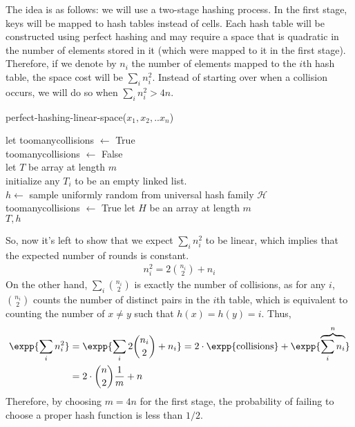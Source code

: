 The idea is as follows: we will use a two-stage hashing process. In the first stage, keys will be mapped to hash tables instead of cells. Each hash table will be constructed using perfect hashing and may require a space that is quadratic in the number of elements stored in it (which were mapped to it in the first stage). Therefore, if we denote by $n_{i}$ the number of elements mapped to the $i$th hash table, the space cost will be $\sum_{i}n_{i}^{2}$. Instead of starting over when a collision occurs, we will do so when $\sum_{i}n_{i}^{2} > 4n$.
  \begin{algorithm}
  \caption{perfect-hashing-linear-space($x_{1},x_{2},..x_{n}$)}
  let toomanycollisions $\leftarrow$ True\\
   {
    toomanycollisions $\leftarrow$ False\\
    let $T$ be array at length $m$ \\
    initialize any $T_{i}$ to be an empty linked list. \\ 
    $h \leftarrow $ sample uniformly random from universal hash family $\mathcal{H}$\\
     {
       toomanycollisions $\leftarrow$ True
     }
  }
  let $H$ be an array at length $m$\\
  \Return $T,h$

  \end{algorithm}
  So, now it's left to show that we expect $\sum_{i} n^{2}_{i}$ to be linear, which implies that the expected number of rounds is constant.
  \begin{equation*}
    \begin{split}
      n_{i}^{2}= 2{ n_{i} \choose 2 } + n_{i}
    \end{split}
  \end{equation*}
On the other hand, $\sum_{i}{ n_{i}\choose 2  }$ is exactly the number of collisions, as for any $i$, ${ n_{i} \choose 2 }$ counts the number of distinct pairs in the $i$th table, which is equivalent to counting the number of $x\neq y$ such that $h(x) = h(y) = i$. Thus,
  \begin{equation*}
    \begin{split}
      \expp{\sum_{i}n^{2}_{i}} &= \expp{\sum_{i} {2{ n_{i} \choose 2 } + n_{i}}}= 2\cdot \expp{\text{collisions}} + \expp{\overbrace{\sum_{i}{n_i}}^{n}}\\
      &= 2 \cdot { n \choose 2} \frac{1}{m} + n
    \end{split}
  \end{equation*}
  Therefore, by choosing $m = 4n$ for the first stage, the probability of failing to choose a proper hash function is less than $1/2$.

